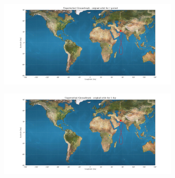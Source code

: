 \documentclass{article}
\begin{document}
\begin{figure}[ht]
	\centering
	\begin{subfigure}[b]{0.45\textwidth}
		\includegraphics[width=\textwidth]{ug1orb.png}
		\caption{}
		\label{fig:1a}
	\end{subfigure}
	\hfill
	\begin{subfigure}[b]{0.45\textwidth}
		\includegraphics[width=\textwidth]{ug1d.png}
		\caption{}
		\label{fig:1b}
	\end{subfigure}
	

\end{figure}
\end{document}
